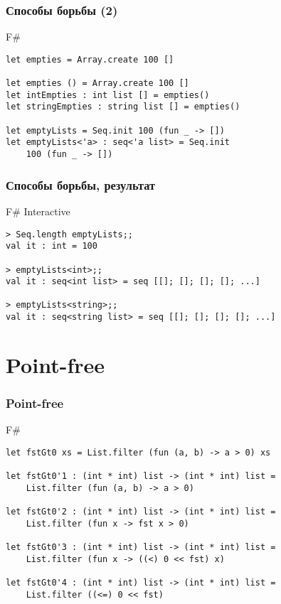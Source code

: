 \documentclass[xetex,mathserif,serif]{beamer}
\begin{document}
	\begin{frame}[fragile]
		\frametitle{Способы борьбы (2)}
		\begin{exampleblock}{F\#}
			\begin{lstlisting}
let empties = Array.create 100 []

let empties () = Array.create 100 []
let intEmpties : int list [] = empties()
let stringEmpties : string list [] = empties()

let emptyLists = Seq.init 100 (fun _ -> [])
let emptyLists<'a> : seq<'a list> = Seq.init 
    100 (fun _ -> [])
\end{lstlisting}
\end{exampleblock}
\end{frame}

	\begin{frame}[fragile]
		\frametitle{Способы борьбы, результат}
\begin{alertblock}{F\# Interactive}
\begin{lstlisting}[keywordstyle=\color{black}]
> Seq.length emptyLists;;
val it : int = 100

> emptyLists<int>;;
val it : seq<int list> = seq [[]; []; []; []; ...]

> emptyLists<string>;;
val it : seq<string list> = seq [[]; []; []; []; ...]
\end{lstlisting}
\end{alertblock}
\end{frame}

	\section{Point-free}
	
	\begin{frame}[fragile]
		\frametitle{Point-free}
		\begin{exampleblock}{F\#}
			\begin{lstlisting}
let fstGt0 xs = List.filter (fun (a, b) -> a > 0) xs

let fstGt0'1 : (int * int) list -> (int * int) list = 
    List.filter (fun (a, b) -> a > 0)

let fstGt0'2 : (int * int) list -> (int * int) list = 
    List.filter (fun x -> fst x > 0)

let fstGt0'3 : (int * int) list -> (int * int) list = 
    List.filter (fun x -> ((<) 0 << fst) x)

let fstGt0'4 : (int * int) list -> (int * int) list = 
    List.filter ((<=) 0 << fst)
\end{lstlisting}
\end{exampleblock}
\end{frame}
\end{document}
